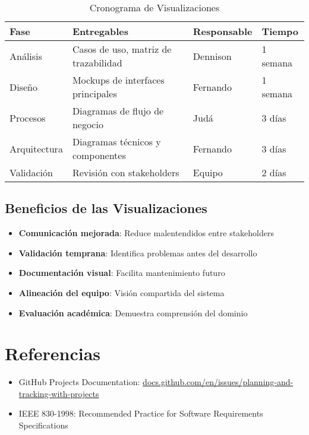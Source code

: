 \documentclass[12pt,a4paper]{article}
\begin{document}
\begin{table}[H]
\centering
\caption{Cronograma de Visualizaciones}
\begin{tabular}{|p{3cm}|p{6cm}|p{3cm}|p{2cm}|}
\hline
\rowcolor{headercolor!30}
\textbf{\color{white}Fase} & \textbf{\color{white}Entregables} & \textbf{\color{white}Responsable} & \textbf{\color{white}Tiempo} \\
\hline
Análisis & Casos de uso, matriz de trazabilidad & Dennison & 1 semana \\
\hline
Diseño & Mockups de interfaces principales & Fernando & 1 semana \\
\hline
Procesos & Diagramas de flujo de negocio & Judá & 3 días \\
\hline
Arquitectura & Diagramas técnicos y componentes & Fernando & 3 días \\
\hline
Validación & Revisión con stakeholders & Equipo & 2 días \\
\hline
\end{tabular}
\end{table}

\subsection{Beneficios de las Visualizaciones}

\begin{itemize}
    \item \textbf{Comunicación mejorada}: Reduce malentendidos entre stakeholders
    \item \textbf{Validación temprana}: Identifica problemas antes del desarrollo
    \item \textbf{Documentación visual}: Facilita mantenimiento futuro
    \item \textbf{Alineación del equipo}: Visión compartida del sistema
    \item \textbf{Evaluación académica}: Demuestra comprensión del dominio
\end{itemize}

\section{Referencias}

\begin{itemize}
    \item GitHub Projects Documentation: \href{https://docs.github.com/en/issues/planning-and-tracking-with-projects}{docs.github.com/en/issues/planning-and-tracking-with-projects}
    \item IEEE 830-1998: Recommended Practice for Software Requirements Specifications
\end{itemize}
\end{document}
